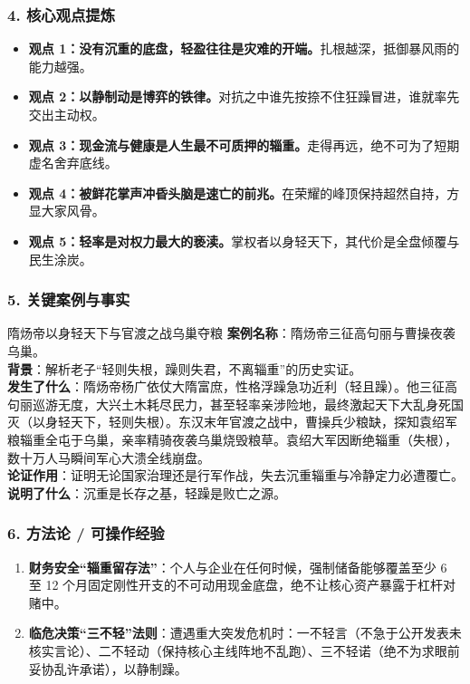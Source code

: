 \subsubsection{4. 核心观点提炼}
\begin{itemize}
    \item \textbf{观点 1：没有沉重的底盘，轻盈往往是灾难的开端。}扎根越深，抵御暴风雨的能力越强。
    \item \textbf{观点 2：以静制动是博弈的铁律。}对抗之中谁先按捺不住狂躁冒进，谁就率先交出主动权。
    \item \textbf{观点 3：现金流与健康是人生最不可质押的辎重。}走得再远，绝不可为了短期虚名舍弃底线。
    \item \textbf{观点 4：被鲜花掌声冲昏头脑是速亡的前兆。}在荣耀的峰顶保持超然自持，方显大家风骨。
    \item \textbf{观点 5：轻率是对权力最大的亵渎。}掌权者以身轻天下，其代价是全盘倾覆与民生涂炭。
\end{itemize}

\subsubsection{5. 关键案例与事实}
\begin{CaseBox}{隋炀帝以身轻天下与官渡之战乌巢夺粮}
\textbf{案例名称}：隋炀帝三征高句丽与曹操夜袭乌巢。\\
\textbf{背景}：解析老子“轻则失根，躁则失君，不离辎重”的历史实证。\\
\textbf{发生了什么}：隋炀帝杨广依仗大隋富庶，性格浮躁急功近利（轻且躁）。他三征高句丽巡游无度，大兴土木耗尽民力，甚至轻率亲涉险地，最终激起天下大乱身死国灭（以身轻天下，轻则失根）。东汉末年官渡之战中，曹操兵少粮缺，探知袁绍军粮辎重全屯于乌巢，亲率精骑夜袭乌巢烧毁粮草。袁绍大军因断绝辎重（失根），数十万人马瞬间军心大溃全线崩盘。\\
\textbf{论证作用}：证明无论国家治理还是行军作战，失去沉重辎重与冷静定力必遭覆亡。\\
\textbf{说明了什么}：沉重是长存之基，轻躁是败亡之源。
\end{CaseBox}

\subsubsection{6. 方法论 / 可操作经验}
\begin{enumerate}
    \item \textbf{财务安全“辎重留存法”}：个人与企业在任何时候，强制储备能够覆盖至少 6 至 12 个月固定刚性开支的不可动用现金底盘，绝不让核心资产暴露于杠杆对赌中。
    \item \textbf{临危决策“三不轻”法则}：遭遇重大突发危机时：一不轻言（不急于公开发表未核实言论）、二不轻动（保持核心主线阵地不乱跑）、三不轻诺（绝不为求眼前妥协乱许承诺），以静制躁。
\end{enumerate}

